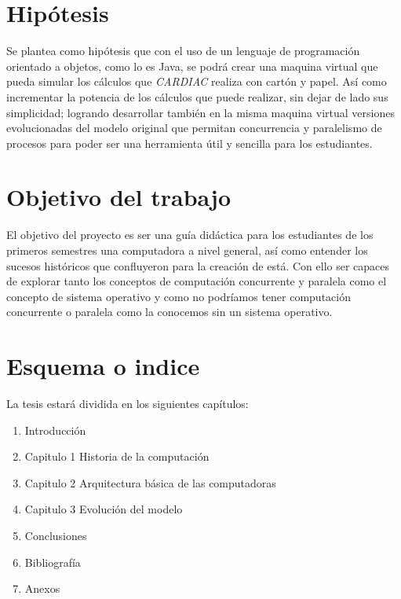 \documentclass[letterpaper,12pt,oneside]{article}
\begin{document}
		\section{Hipótesis}
		
		Se plantea como hipótesis que con el uso de un lenguaje de programación orientado a objetos, como lo es Java, se podrá
		crear una maquina virtual que pueda simular los cálculos que \textit{CARDIAC} realiza con cartón y papel. Así como
		incrementar la potencia de los cálculos que puede realizar, sin dejar de lado sus simplicidad; logrando
		desarrollar también en la misma maquina virtual versiones evolucionadas del modelo original que permitan
		concurrencia y paralelismo de procesos para poder ser una herramienta útil y sencilla para los estudiantes.
		
		
		\section{Objetivo del trabajo}
			
			El objetivo del proyecto es ser una guía didáctica para los estudiantes de los primeros semestres
			una computadora a nivel general, así como entender los sucesos históricos que confluyeron para la creación de está. Con ello
			ser capaces de explorar
			tanto los conceptos de computación concurrente y paralela como
			el concepto de sistema operativo y como no podríamos tener computación concurrente o paralela como
			la conocemos sin un sistema operativo.
		
		\section{Esquema o indice}
		
		La tesis estará dividida en los siguientes capítulos:
		
		\begin{enumerate}
			\item Introducción
			\item Capitulo 1 Historia de la computación
			\item Capitulo 2 Arquitectura básica de las computadoras
			\item Capitulo 3 Evolución del modelo
			\item Conclusiones
			\item Bibliografía
			\item Anexos
			
		\end{enumerate}
		
\end{document}
